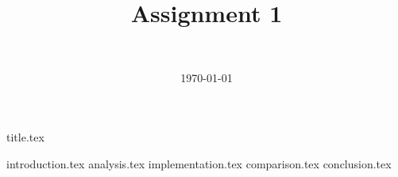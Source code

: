 \documentclass[final]{article}
\title{Assignment 1}
\author{~}
\date{\today}
\begin{document}

{title.tex}
\newpage
\tableofcontents

\newpage
{}
{introduction.tex}
\newpage
{analysis.tex}
{implementation.tex}
{comparison.tex}
{conclusion.tex}

\end{document}
